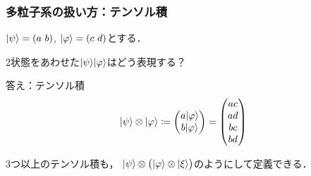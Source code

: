 \documentclass[
    10pt,
    ]{sotsu-beamer}
\begin{document}
\begin{frame}
    \frametitle{多粒子系の扱い方：テンソル積}

    $\lvert\psi\rangle = (a \,\, b)$, $\lvert\varphi\rangle = (c \,\, d)$とする．

    2状態をあわせた$\lvert\psi\rangle\lvert\varphi\rangle$はどう表現する？

    \pause

    答え：\alert{テンソル積}
    \begin{equation}
        \lvert\psi\rangle \otimes \lvert\varphi\rangle
            \coloneq \begin{pmatrix}
                a \lvert\varphi\rangle  \\  b \lvert\varphi\rangle
            \end{pmatrix}
            = \begin{pmatrix}
                ac \\ ad \\ bc \\ bd
            \end{pmatrix}
    \end{equation}

    \pause

    3つ以上のテンソル積も，
    $\lvert\psi\rangle \otimes \bigl( \lvert\varphi\rangle \otimes \lvert\xi\rangle \bigr)$のようにして定義できる．

\end{frame}
\end{document}
